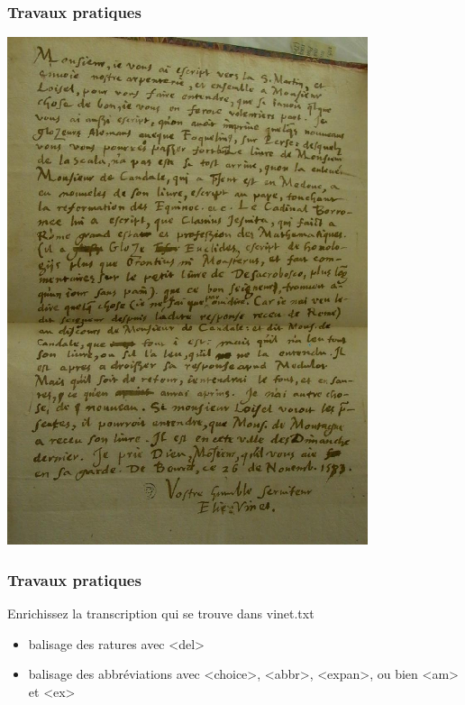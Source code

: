 \documentclass[]{beamer}\makeatletter
\begin{document}
\begin{frame}
\frametitle{Travaux pratiques}
    \noindent
  \includegraphics[width=\textwidth]{../Graphics/vinet.png}
\end{frame}

\begin{frame}
\frametitle{Travaux pratiques}\par
Enrichissez la transcription qui se trouve dans \textsf{vinet.txt}\par
 \begin{itemize}

\item balisage des ratures avec {\color{blue2}<del>}
\item balisage des abbréviations avec {\color{blue2}<choice>}, {\color{blue2}<abbr>}, {\color{blue2}<expan>}, ou bien {\color{blue2}<am>} et {\color{blue2}<ex>}
\end{itemize}  
\end{frame}
\end{document}
